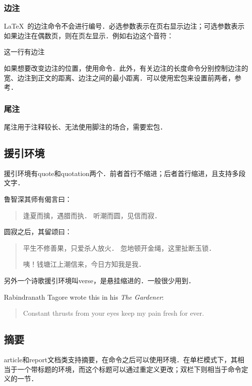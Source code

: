 \subsubsection{边注}
\LaTeX\ 的边注命令不会进行编号．必选参数表示在页右显示边注；可选参数表示如果边注在偶数页，则在页左显示．例如右边这个音符：\marginpar{\twonotes}
\begin{latex}
这一行有边注
\end{latex}

如果想要改变边注的位置，使用命令．此外，有关边注的长度命令分别控制边注的宽、边注到正文的距离、边注之间的最小距离．可以使用宏包来设置前两者，参考．

\subsubsection{尾注}
尾注用于注释较长、无法使用脚注的场合，需要宏包．

\subsection{援引环境}
援引环境有quote和quotation两个．前者首行不缩进；后者首行缩进，且支持多段文字．

\begin{codeshow}
鲁智深其师有偈言曰：
\begin{quote}
逢夏而擒，遇腊而执．
听潮而圆，见信而寂．
\end{quote}
圆寂之后，其留颂曰：
\begin{quotation}
平生不修善果，只爱杀人放火．
忽地顿开金绳，这里扯断玉锁．

咦！钱塘江上潮信来，今日方知我是我．
\end{quotation}
\end{codeshow}

另外一个诗歌援引环境叫verse，\label{envi:verse}是悬挂缩进的．一般很少用到．

\begin{codeshow}
Rabindranath Tagore wrote this in 
his \emph{The Gardener}: 
\begin{verse}
Constant thrusts from your eyes
keep my pain fresh for ever.
\end{verse}
\end{codeshow}

\subsection{摘要}
article和report文档类支持摘要，在命令之后可以使用环境．在单栏模式下，其相当于一个带标题的环境，而这个标题可以通过重定义更改；双栏下则相当于命令定义的一节．

